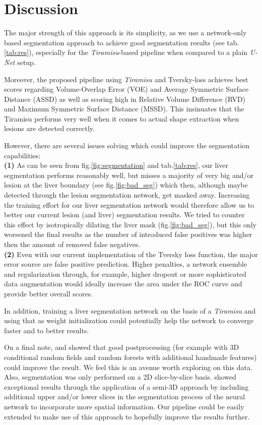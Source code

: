 \documentclass{article}
\begin{document}
\section{Discussion}
\label{sec:StrWeak}

The major strength of this approach is its simplicity, as we use a network-only based segmentation approach to achieve good segmentation results (see tab.\ref{tab:res}), especially for the \textit{Tiramisu}-based pipeline when compared to a plain \textit{U-Net} setup.

Moreover, the proposed pipeline using \textit{Tiramisu} and Tversky-loss achieves best scores regarding Volume-Overlap Error (VOE) and Average Symmetric Surface Distance (ASSD) as well as scoring high in Relative Volume Difference (RVD) and Maximum Symmetric Surface Distance (MSSD). This insinuates that the Tiramisu performs very well when it comes to actual shape extraction when lesions are detected correctly.

However, there are several issues solving which could improve the segmentation capabilities:\\
\textbf{(1)} As can be seen from fig.\ref{fig:segmentation} and tab.\ref{tab:res}, our liver segmentation performs reasonably well, but misses a majority of very big and/or lesion at the liver boundary (see fig.\ref{fig:bad_seg}) which then, although maybe detected through the lesion segmentation network, get masked away. Increasing the training effort for our liver segmentation network would therefore allow us to better our current lesion (and liver) segmentation results. We tried to counter this effect by isotropically dilating the liver mask (fig.\ref{fig:bad_seg}), but this only worsened the final results as the number of introduced false positives was higher then the amount of removed false negatives.\\
\textbf{(2)} Even with our current implementation of the Tversky loss function, the major error source are false positive prediction. Higher penalties, a network ensemble and regularization through, for example, higher dropout or more sophisticated data augmentation would ideally increase the area under the ROC curve and provide better overall scores.

In addition, training a liver segmentation network on the basis of a \textit{Tiramisu} and using that as weight initialization could potentially help the network to converge faster and to better results.

On a final note, \cite{LITS} and \cite{unet_rf} showed that good postprocessing (for example with 3D conditional random fields and random forests with additional handmade features) could improve the result. We feel this is an avenue worth exploring on this data.
Also, segmentation was only performed on a 2D slice-by-slice basis. \cite{2p5Dnet} showed exceptional results through the application of a semi-3D approach by including additional upper and/or lower slices in the segmentation process of the neural network to incorporate more spatial information. Our pipeline could be easily extended to make use of this approach to hopefully improve the results further.


\newpage

 
\label{sec:ref}

\end{document}
